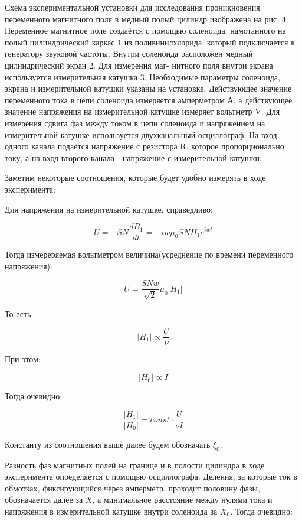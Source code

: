 \documentclass[a4paper,12pt]{article} %
\begin{document}
Схема экспериментальной установки для исследования проникновения переменного магнитного поля в медный полый цилиндр изображена на рис. 4. Переменное магнитное поле создаётся с помощью соленоида, намотанного на полый цилиндрический каркас 1 из поливинилхлорида, который подключается к генератору звуковой частоты. Внутри соленоида расположен медный цилиндрический экран 2. Для измерения маг-
нитного поля внутри экрана используется измерительная катушка 3. Необходимые параметры соленоида, экрана и измерительной катушки указаны на установке. Действующее значение переменного тока в цепи
соленоида измеряется амперметром А, а действующее значение напряжения на измерительной катушке измеряет вольтметр V. Для измерения сдвига фаз между током в цепи соленоида и напряжением на измерительной катушке используется двухканальный осциллограф. На вход одного канала подаётся напряжение с резистора R, которое пропорционально току, а на вход второго канала - напряжение с измерительной катушки.

Заметим некоторые соотношения, которые будет удобно измерять в ходе эксперимента:

Для напряжения на измерительной катушке, справедливо:

\begin{equation}
	U = -SN\frac{dB_1}{dt} = -iw\mu_0 SNH_1 e^{iwt}
\end{equation}

Тогда измереряемая вольтметром величина(усреднение по времени переменного напряжения):

\begin{equation}
	U = \frac{SNw}{\sqrt{2}}\mu_0|H_1|
\end{equation}

То есть:

\begin{equation}
	|H_1|\propto \frac{U}{\nu}
\end{equation}

При этом:

\begin{equation}
	|H_0|\propto I
\end{equation}

Тогда очевидно:

\begin{equation}
	\frac{|H_1|}{|H_0|} = const\cdot \frac{U}{\nu I}
\end{equation}

Константу из соотношения выше далее будем обозначать $\xi_0$.

Разность фаз магнитных полей на границе и в полости цилиндра в ходе эксперимента определяется с помощью осциллографа. Деления, за которые ток в обмотках, фиксирующийся через амперметр, проходит половину фазы, обозначается далее за $X$, а минимальное расстояние между нулями тока и напряжения в измерительной катушке внутри соленоида за $X_0$. Тогда очевидно:
\end{document}
